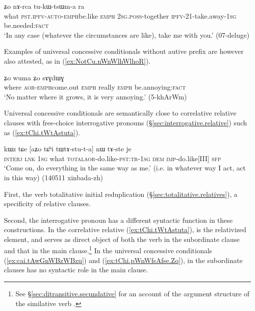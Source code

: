  \begin{exe}
\ex \label{ex:tChi.pWnWfsAfse.Zo}
 ʑo nɤ-rca tu-kɯ-tsɯm-a ra \\
what \textsc{pst}.\textsc{ipfv}-\textsc{auto}-\textsc{emph}\redp{}be.like \textsc{emph} \textsc{2sg}.\textsc{poss}-together \textsc{ipfv}-2\fl{}1-take.away-\textsc{1sg} be.needed:\textsc{fact} \\
\glt `In any case (whatever the circumstances are like), take me with you.' (07-deluge)
\end{exe}

Examples of universal concessive conditionals without autive prefix are however also attested, as in (\ref{ex:NotCu.nWnWlhWlhoR}).

\begin{exe}
\ex \label{ex:NotCu.nWnWlhWlhoR}
 ʑo wuma ʑo sɤɣdɯɣ \\
where \textsc{aor}-\textsc{emph}\redp{}come.out \textsc{emph} really \textsc{emph} be.annoying:\textsc{fact} \\
\glt `No matter where it grows, it is very annoying.' (5-khArWm)
\end{exe}

Universal concessive conditionals are semantically close to correlative relative clauses with free-choice interrogative pronouns (§\ref{sec:interrogative.relative}) such as (\ref{ex:tChi.tWtAstuta}). 

\begin{exe}
\ex \label{ex:tChi.tWtAstuta}
\gll kɯz tɕe [aʑo tɕʰi tɯ\redp{}tɤ-stu-t-a] nɯ tɤ-ste je \\
\textsc{interj} \textsc{lnk} \textsc{1sg} what \textsc{total}\redp{}\textsc{aor}-do.like-\textsc{pst}:\textsc{tr}-\textsc{1sg} \textsc{dem} \textsc{imp}-do.like[III] \textsc{sfp} \\
\glt `Come on, do everything in the same way as me.' (i.e. in whatever way I act, act in this way) (140511 xinbada-zh)
\end{exe}

First, the verb  totalitative initial reduplication (§\ref{sec:totalitative.relatives}), a specificity of relative clauses. 

Second, the interrogative pronoun  has a different syntactic function in these constructions. In the correlative relative (\ref{ex:tChi.tWtAstuta}),  is the relativized element, and serves as direct object of both the verb in the subordinate clause and that in the main clause.\footnote{See §\ref{sec:ditransitive.secundative} for an account of the argument structure of the similative verb . } In the universal concessive conditionals (\ref{ex:cai.tAwGnWBzWBzu}) and (\ref{ex:tChi.pWnWfsAfse.Zo}),  in the subordinate clauses has no syntactic role in the main clause.
  
